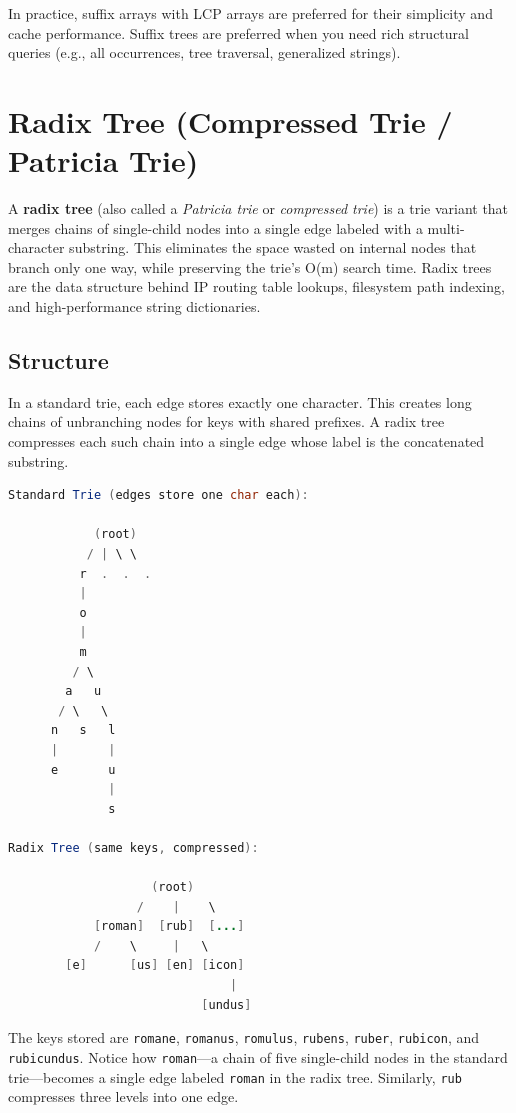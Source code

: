 In practice, suffix arrays with LCP arrays are preferred for their simplicity and cache performance. Suffix trees are preferred when you need rich structural queries (e.g., all occurrences, tree traversal, generalized strings).

\section{Radix Tree (Compressed Trie / Patricia Trie)}

A \textbf{radix tree} (also called a \emph{Patricia trie} or \emph{compressed trie}) is a trie variant that merges chains of single-child nodes into a single edge labeled with a multi-character substring. This eliminates the space wasted on internal nodes that branch only one way, while preserving the trie's O(m) search time. Radix trees are the data structure behind IP routing table lookups, filesystem path indexing, and high-performance string dictionaries.

\subsection{Structure}

In a standard trie, each edge stores exactly one character. This creates long chains of unbranching nodes for keys with shared prefixes. A radix tree compresses each such chain into a single edge whose label is the concatenated substring.

\begin{lstlisting}[language=Java]
Standard Trie (edges store one char each):

            (root)
           / | \ \
          r  .  .  .
          |
          o
          |
          m
         / \
        a   u
       / \   \
      n   s   l
      |       |
      e       u
              |
              s

Radix Tree (same keys, compressed):

                    (root)
                  /    |    \
            [roman]  [rub]  [...]
            /    \     |   \
        [e]      [us] [en] [icon]
                               |
                           [undus]
\end{lstlisting}

\noindent
The keys stored are \texttt{romane}, \texttt{romanus}, \texttt{romulus}, \texttt{rubens}, \texttt{ruber}, \texttt{rubicon}, and \texttt{rubicundus}. Notice how \texttt{roman}---a chain of five single-child nodes in the standard trie---becomes a single edge labeled \texttt{roman} in the radix tree. Similarly, \texttt{rub} compresses three levels into one edge.

